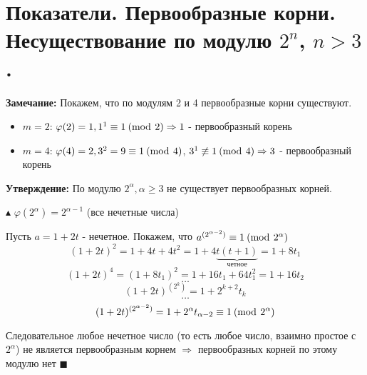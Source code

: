 \section{Показатели. Первообразные корни. Несуществование по модулю $2^n$, $n > 3$.}
\par \textbf{Замечание:} Покажем, что по модулям 2 и 4 первообразные корни существуют.
\begin{itemize}
    \item[]$m=2$: $\varphi(2)=1, 1^1 \equiv 1 \: (\operatorname{mod} \: 2) \Rightarrow 1$ - первообразный корень
    \item[]$m=4$: $\varphi(4)=2, 3^2=9 \equiv 1 \: (\operatorname{mod} \: 4)$, $3^1 \not\equiv 1 \: (\operatorname{mod} \: 4) \Rightarrow 3$ - первообразный корень
\end{itemize}
\par \textbf{Утверждение:} По модулю $2^\alpha, \alpha \geq 3$ не существует первообразных корней.
\par $\blacktriangle$ $\varphi(2^\alpha)=2^{\alpha-1}$ (все нечетные числа)
\par Пусть $a=1+2t$ - нечетное. Покажем, что $a^{(2^{\alpha-2})} \equiv 1 \: (\operatorname{mod} \: 2^\alpha)$
$$(1+2t)^2=1+4t+4t^2=1+4\underbrace{t(t+1)}_\text{четное}=1+8t_1$$
$$(1+2t)^4=(1+8t_1)^2=1+16t_1+64t_1^2=1+16t_2$$
$$\ldots$$
$$(1+2t)^{(2^{k})}=1+2^{k+2} t_{k}$$
$$\ldots$$
$$(1+2t)^{(2^{\alpha-2})}=1+2^\alpha t_{\alpha-2} \equiv 1 \: (\operatorname{mod} \: 2^\alpha)$$
\par Следовательное любое нечетное число (то есть любое число, взаимно простое с $2^\alpha$) не является первообразным корнем $\Rightarrow$ первообразных корней по этому модулю нет $\blacksquare$


